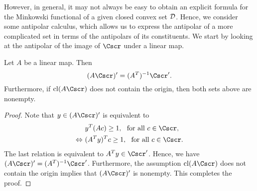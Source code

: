 \documentclass{siamltex}   %
\begin{document}
  However, in general, it may not always be easy to
  obtain an explicit formula for the Minkowski functional of a given closed convex set ${\cal D}$. Hence, we consider some antipolar calculus,
  which allows us to express the antipolar of a more complicated set in terms of the antipolars of its constituents.
  We start by looking at the antipolar of the image of $\Cscr$ under a linear map.
  \begin{proposition}\label{sec3:antipolarAC}
    Let $A$ be a linear map. Then
    \[
    (A\Cscr)' = (A^T)^{-1}\Cscr'.
    \]
    Furthermore, if ${\rm cl}(A\Cscr)$ does not contain the origin, then both sets above are nonempty.
  \end{proposition}
  \begin{proof}
    Note that $y\in (A\Cscr)'$ is equivalent to
    \begin{equation*}
      \begin{split}
        &\ y^T(Ac) \ge 1,\ \ \mbox{for all $c\in \Cscr$},\\
        \Leftrightarrow &\ (A^Ty)^Tc \ge 1,\ \ \mbox{for all $c\in \Cscr$}.
      \end{split}
    \end{equation*}
    The last relation is equivalent to $A^Ty \in \Cscr'$. Hence, we have $(A\Cscr)' = (A^T)^{-1}\Cscr'$.
    Furthermore, the assumption ${\rm cl}(A\Cscr)$ does not contain the origin implies that $(A\Cscr)'$ is nonempty. This completes the proof.
  \end{proof}
\end{document}
